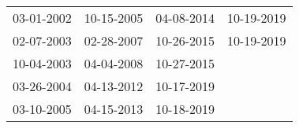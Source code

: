 \begin{supertabular}{llll}
 03-01-2002 &  10-15-2005 &  04-08-2014 &  10-19-2019 \\
 02-07-2003 &  02-28-2007 &  10-26-2015 &  10-19-2019 \\
 10-04-2003 &  04-04-2008 &  10-27-2015 &             \\
 03-26-2004 &  04-13-2012 &  10-17-2019 &             \\
 03-10-2005 &  04-15-2013 &  10-18-2019 &             \\
\end{supertabular}
